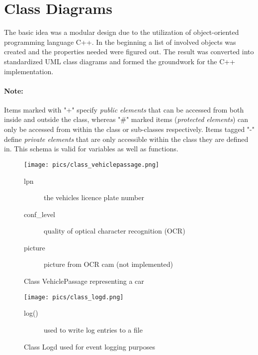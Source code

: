 \documentclass[oneside,bachelor,etd]{BYUPhys}
\begin{document}

\section{Class Diagrams}
\label{sec:2classdiagrams}

The basic idea was a modular design due to the utilization of object-oriented programming language C++.
In the beginning a list of involved objects was created and the properties needed were figured out. The result
was converted into standardized UML class diagrams and formed the groundwork for the C++ implementation.

\paragraph{Note:} Items marked with "+" specify \textit{public elements} that can be accessed  from both inside and outside
the class, whereas "\#" marked items (\textit{protected elements}) can only be accessed from within the class or sub-classes respectively.
Items tagged "-" define \textit{private elements} that are only accessible within the class they are defined in.
This schema is valid for variables as well as functions.

\begin{figure}[p]
    \centerline{\texttt{[image: pics/class\_vehiclepassage.png]}}
    \caption[Class VehiclePassage]{\label{fig:Class VehiclePassage}
	Class VehiclePassage representing a car}

	\begin{description}
	\item[lpn] the vehicles licence plate number
	\item[conf\_level] quality of optical character recognition (OCR)
	\item[picture] picture from OCR cam (not implemented)
	\end{description}
\end{figure}

\begin{figure}[p]
    \centerline{\texttt{[image: pics/class\_logd.png]}}
    \caption[Class Logd]{\label{fig:Class Logd}
	Class Logd used for event logging purposes}
	
	\begin{description}
	\item[log()] used to write log entries to a file
	\end{description}
\end{figure}
\end{document}
